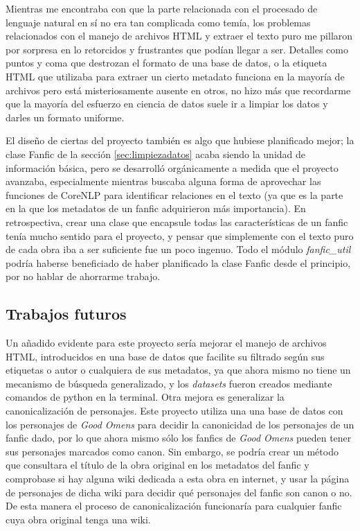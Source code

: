 \documentclass{pre-tfg}
\begin{document}
Mientras me encontraba con que la parte relacionada con el procesado de lenguaje natural en sí no era tan complicada como temía, los problemas relacionados con el manejo de archivos HTML y extraer el texto puro me pillaron por sorpresa en lo retorcidos y frustrantes que podían llegar a ser. Detalles como puntos y coma que destrozan el formato de una base de datos, o la etiqueta HTML que utilizaba para extraer un cierto metadato funciona en la mayoría de archivos pero está misteriosamente ausente en otros, no hizo más que recordarme que la mayoría del esfuerzo en ciencia de datos suele ir a limpiar los datos y darles un formato uniforme.

El diseño de ciertas del proyecto también es algo que hubiese planificado mejor; la clase Fanfic de la sección \ref{sec:limpiezadatos} acaba siendo la unidad de información básica, pero se desarrolló orgánicamente a medida que el proyecto avanzaba, especialmente mientras buscaba alguna forma de aprovechar las funciones de CoreNLP para identificar relaciones en el texto (ya que es la parte en la que los metadatos de un fanfic adquirieron más importancia). En retrospectiva, crear una clase que encapsule todas las características de un fanfic tenía mucho sentido para el proyecto, y pensar que simplemente con el texto puro de cada obra iba a ser suficiente fue un poco ingenuo. Todo el módulo \textit{fanfic\_util} podría haberse beneficiado de haber planificado la clase Fanfic desde el principio, por no hablar de ahorrarme trabajo.

\subsection{Trabajos futuros}

Un añadido evidente para este proyecto sería mejorar el manejo de archivos HTML, introducidos en una base de datos que facilite su filtrado según sus etiquetas o autor o cualquiera de sus metadatos, ya que ahora mismo no tiene un mecanismo de búsqueda generalizado, y los \textit{datasets} fueron creados mediante comandos de python en la terminal. Otra mejora es generalizar la canonicalización de personajes. Este proyecto utiliza una una base de datos con los personajes de \textit{Good Omens} para decidir la canonicidad de los personajes de un fanfic dado, por lo que ahora mismo sólo los fanfics de \textit{Good Omens} pueden tener sus personajes marcados como canon. Sin embargo, se podría crear un método que consultara el título de la obra original en los metadatos del fanfic y comprobase si hay alguna wiki dedicada a esta obra en internet, y usar la página de personajes de dicha wiki para decidir qué personajes del fanfic son canon o no. De esta manera el proceso de canonicalización funcionaría para cualquier fanfic cuya obra original tenga una wiki.
\end{document}

